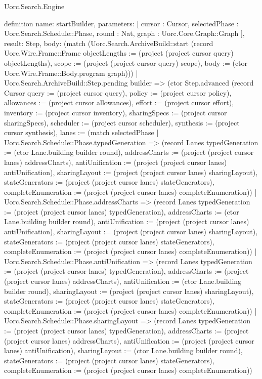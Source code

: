 \begin{lexlean}{Uorc.Search.Engine}
\begin{semanticmodule}
definition{
  name: startBuilder,
  parameters: [
    cursor : Cursor,
    selectedPhase : Uorc.Search.Schedule::Phase,
    round : Nat,
    graph : Uorc.Core.Graph::Graph
  ],
  result: Step,
  body: (match (Uorc.Search.ArchiveBuild::start (record Uorc.Wire.Frame::Frame {objectLengths := (project (project cursor query) objectLengths), scope := (project (project cursor query) scope), body := (ctor Uorc.Wire.Frame::Body.program graph)}))
    | Uorc.Search.ArchiveBuild::Step.pending builder => (ctor Step.advanced (record Cursor {query := (project cursor query), policy := (project cursor policy), allowances := (project cursor allowances), effort := (project cursor effort), inventory := (project cursor inventory), sharingSpecs := (project cursor sharingSpecs), scheduler := (project cursor scheduler), synthesis := (project cursor synthesis), lanes := (match selectedPhase
      | Uorc.Search.Schedule::Phase.typedGeneration => (record Lanes {typedGeneration := (ctor Lane.building builder round), addressCharts := (project (project cursor lanes) addressCharts), antiUnification := (project (project cursor lanes) antiUnification), sharingLayout := (project (project cursor lanes) sharingLayout), stateGenerators := (project (project cursor lanes) stateGenerators), completeEnumeration := (project (project cursor lanes) completeEnumeration)})
      | Uorc.Search.Schedule::Phase.addressCharts => (record Lanes {typedGeneration := (project (project cursor lanes) typedGeneration), addressCharts := (ctor Lane.building builder round), antiUnification := (project (project cursor lanes) antiUnification), sharingLayout := (project (project cursor lanes) sharingLayout), stateGenerators := (project (project cursor lanes) stateGenerators), completeEnumeration := (project (project cursor lanes) completeEnumeration)})
      | Uorc.Search.Schedule::Phase.antiUnification => (record Lanes {typedGeneration := (project (project cursor lanes) typedGeneration), addressCharts := (project (project cursor lanes) addressCharts), antiUnification := (ctor Lane.building builder round), sharingLayout := (project (project cursor lanes) sharingLayout), stateGenerators := (project (project cursor lanes) stateGenerators), completeEnumeration := (project (project cursor lanes) completeEnumeration)})
      | Uorc.Search.Schedule::Phase.sharingLayout => (record Lanes {typedGeneration := (project (project cursor lanes) typedGeneration), addressCharts := (project (project cursor lanes) addressCharts), antiUnification := (project (project cursor lanes) antiUnification), sharingLayout := (ctor Lane.building builder round), stateGenerators := (project (project cursor lanes) stateGenerators), completeEnumeration := (project (project cursor lanes) completeEnumeration)})
}}
\end{semanticmodule}
\end{lexlean}
